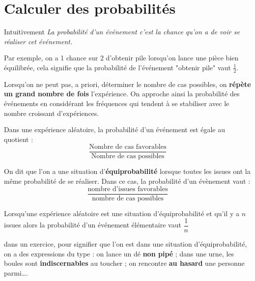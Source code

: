 \section{Calculer des probabilités}
\begin{myBox}{ Intuitivement }
    \textit{La probabilité d'un événement c'est la chance qu'on a de voir se réaliser cet événement.}
    
    \smallskip
    Par exemple, on a 1 chance sur 2 d'obtenir pile lorsqu'on lance une pièce bien équilibrée, cela signifie que la probabilité de l'événement "obtenir pile" vaut $\frac12$.
    
    \smallskip
    Lorsqu'on ne peut pas, a priori, déterminer le nombre de cas possibles, on \textbf{répète un grand nombre de fois} l'expérience. On approche ainsi la probabilité des événements en considérant les fréquences qui tendent à se stabiliser avec le nombre croissant d'expériences.
\end{myBox}
\begin{definition}
    Dans une expérience aléatoire, la probabilité d'un événement est égale au quotient :
    $$\dfrac{\text{Nombre de cas favorables}}{\text{Nombre de cas possibles}}$$
\end{definition}

\begin{vocabulaire}
    On dit que l'on a une situation d'\textbf{équiprobabilité} lorsque toutes les issues ont la même probabilité de se réaliser.
    Dans ce cas, la probabilité d'un évènement vaut : 
    $$\dfrac{\text{nombre d'issues favorables}}{\text{nombre de cas possibles}}$$
\end{vocabulaire}

\begin{propriete}[\admise]
    Lorsqu'une expérience aléatoire est une situation d'équiprobabilité et qu'il y a $n$ issues alors la probabilité d'un événement élémentaire vaut $\dfrac{1}{n}$
\end{propriete}

\begin{remarque}
   dans un exercice, pour signifier que l'on est dans une situation d'équiprobabilité, on a des expressions du type : \og on lance un dé \textbf{non pipé} \fg ; \og dans une urne, les boules sont \textbf{indiscernables} au toucher \fg ; \og on rencontre \textbf{au hasard} une personne parmi\dots \fg.
\end{remarque}

